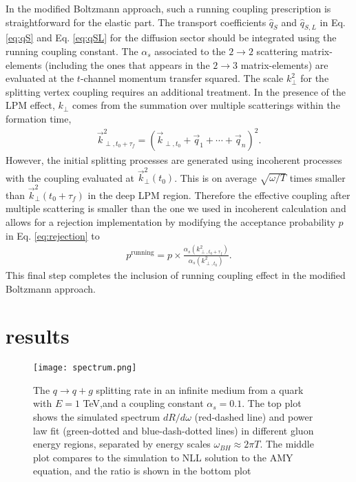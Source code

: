 In the modified Boltzmann approach, such a running coupling prescription is straightforward for the elastic part.
The transport coefficients $\hat{q}_S$ and $\hat{q}_{S, L}$ in Eq. \ref{eq:qS} and Eq. \ref{eq:qSL} for the diffusion sector should be integrated using the running coupling constant.
The $\alpha_s$ associated to the $2\rightarrow 2$ scattering matrix-elements (including the ones that appears in the $2\rightarrow 3$ matrix-elements) are evaluated at the $t$-channel momentum transfer squared.
The scale $k_\perp^2$ for the splitting vertex coupling requires an additional treatment.
In the presence of the LPM effect, $k_\perp$ comes from the summation over multiple scatterings within the formation time,
\begin{eqnarray}\label{eq:kTn}
\vec{k}_{\perp, t_0+\tau_f}^2 = \left(\vec{k}_{\perp,t_0}+\vec{q}_1+\cdots+\vec{q}_n\right)^2.
\end{eqnarray} 
However, the initial splitting processes are generated using incoherent processes with the coupling evaluated at $\vec{k}_{\perp}^2(t_0)$.
This is on average $\sqrt{\omega/T}$ times smaller than $\vec{k}_{\perp}^2(t_0+\tau_f)$ in the deep LPM region.
Therefore the effective coupling after multiple scattering is smaller than the one we used in incoherent calculation and allows for a rejection implementation by modifying the acceptance probability $p$ in Eq. \ref{eq:rejection} to
\begin{eqnarray}
p^{\textrm{running}} = p\times \frac{\alpha_s(k_{\perp,t_0+\tau_f}^2)}{\alpha_s(k_{\perp,t_0}^2)}.
\end{eqnarray}
This final step completes the inclusion of running coupling effect in the modified Boltzmann approach.

\section{results}\label{section:results}
\begin{figure}
\texttt{[image: spectrum.png]}
\caption{The $q\rightarrow q+g$ splitting rate in an infinite medium from a quark with $E=1$ TeV,and a coupling constant $\alpha_s = 0.1$. The top plot shows the simulated spectrum $dR/d\omega$ (red-dashed line) and power law fit (green-dotted and blue-dash-dotted lines) in different gluon energy regions, separated by energy scales $\omega_{BH}\approx 2\pi T$. The middle plot compares to the simulation to NLL solution to the AMY equation, and the ratio is shown in the bottom plot}
\label{fig:spectrum}
\end{figure}

